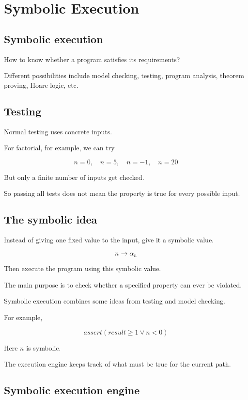 \documentclass[11pt]{book}
\begin{document}
\setcounter{chapter}{2}
\chapter{Symbolic Execution}


\section{Symbolic execution}

How to know whether a program satisfies its requirements?

Different possibilities include model checking, testing,
program analysis, theorem proving, Hoare logic, etc.

\section{Testing}

Normal testing uses concrete inputs.

For factorial, for example, we can try

\[
n=0,\quad n=5,\quad n=-1,\quad n=20
\]

But only a finite number of inputs get checked.

So passing all tests does not mean the property is true
for every possible input.

\section{The symbolic idea}

Instead of giving one fixed value to the input,
give it a symbolic value.

\[
n \rightarrow \alpha_n
\]

Then execute the program using this symbolic value.

\begin{ppkey}
The main purpose is to check whether a specified property
can ever be violated.

Symbolic execution combines some ideas from testing
and model checking.
\end{ppkey}

For example,

\[
assert(result \geq 1 \lor n<0)
\]

Here $n$ is symbolic.

The execution engine keeps track of what must be true
for the current path.

\section{Symbolic execution engine}
\end{document}
